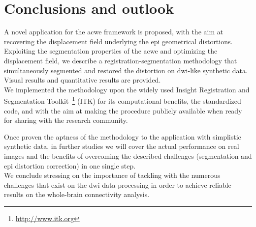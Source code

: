 \section{Conclusions and outlook}
\label{sec:conclusion}
%
A novel application for the \gls{acwe} framework is proposed,
with the aim at recovering the displacement field underlying 
the \gls{epi} geometrical distortions. Exploiting the segmentation
properties of the \gls{acwe} and optimizing the displacement
field, we describe a registration-segmentation methodology that
simultaneously segmented and restored the distortion on 
\gls{dwi}-like synthetic data. Visual results and quantitative
results are provided. \\

We implemented the methodology upon the widely used
Insight Registration and Segmentation 
Toolkit~\footnote{\url{http://www.itk.org}} (ITK)
for its computational benefits, the standardized code, and 
with the aim at making the procedure publicly available 
when ready for sharing with the research community.

Once proven the aptness of the methodology to the application
with simplistic synthetic data, in further studies we will 
cover the actual performance on real images and the benefits 
of overcoming the described challenges (segmentation and 
\gls{epi} distortion correction) in one single step.\\

We conclude stressing on the importance of tackling with
the numerous challenges that exist on the \gls{dwi} data 
processing in order to achieve reliable results on the
whole-brain connectivity analysis.
